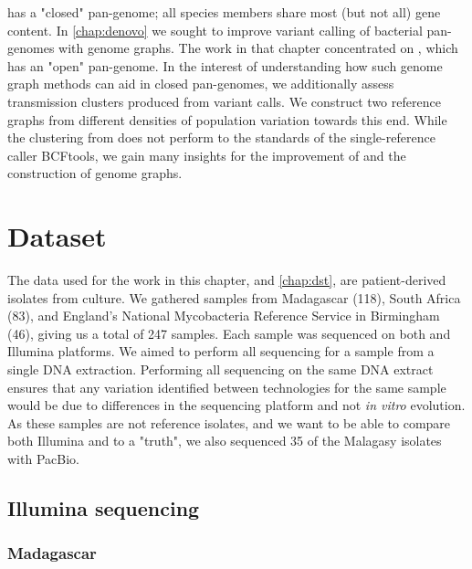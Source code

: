 \mtb{} has a "closed" pan-genome; all species members share most (but not all) gene content. In \autoref{chap:denovo} we sought to improve variant calling of bacterial pan-genomes with genome graphs. The work in that chapter concentrated on \ecoli{}, which has an "open" pan-genome. In the interest of understanding how such genome graph methods can aid in closed pan-genomes, we additionally assess transmission clusters produced from \pandora{} variant calls. We construct two \mtb{} reference graphs from different densities of population variation towards this end. While the clustering from \pandora{} does not perform to the standards of the single-reference caller BCFtools, we gain many insights for the improvement of \pandora{} and the construction of genome graphs.


\section{Dataset}
\label{sec:ch2-dataset}

The data used for the work in this chapter, and \autoref{chap:dst}, are patient-derived \mtb{} isolates from culture. We gathered samples from Madagascar (118), South Africa (83), and England's National Mycobacteria Reference Service in Birmingham (46), giving us a total of 247 samples.  
Each sample was sequenced on both \ont{} and Illumina platforms. We aimed to perform all sequencing for a sample from a single DNA extraction. Performing all sequencing on the same DNA extract ensures that any variation identified between technologies for the same sample would be due to differences in the sequencing platform and not \textit{in vitro} evolution.  
As these samples are not reference isolates, and we want to be able to compare both Illumina and \ont{} to a "truth", we also sequenced 35 of the Malagasy isolates with PacBio.

\subsection{Illumina sequencing}

\subsubsection{Madagascar}


